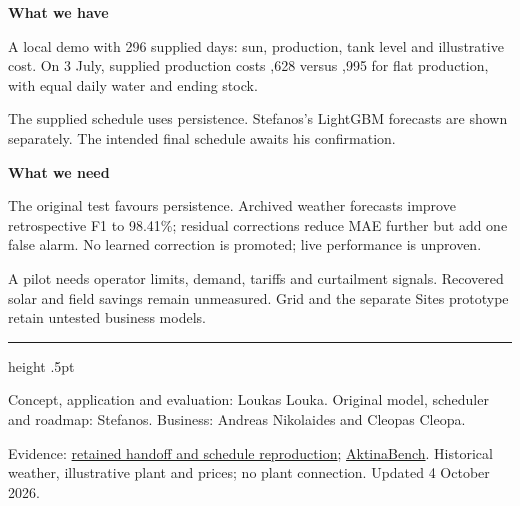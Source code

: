 \documentclass[11pt,a4paper]{article}
\begin{document}
\vspace{6mm}
\begin{minipage}[t]{.48\linewidth}
{\large\bfseries What we have}\par
A local demo with 296 supplied days: sun, production, tank level and illustrative cost. On 3 July, supplied production costs ,628 versus ,995 for flat production, with equal daily water and ending stock.

The supplied schedule uses persistence. Stefanos's LightGBM forecasts are shown separately. The intended final schedule awaits his confirmation.
\end{minipage}\hfill
\begin{minipage}[t]{.47\linewidth}
{\large\bfseries What we need}\par
The original test favours persistence. Archived weather forecasts improve retrospective F1 to 98.41\%; residual corrections reduce MAE further but add one false alarm. No learned correction is promoted; live performance is unproven.

A pilot needs operator limits, demand, tariffs and curtailment signals. Recovered solar and field savings remain unmeasured. Grid and the separate Sites prototype retain untested business models.
\end{minipage}

\vfill
\hrule height .5pt\vspace{3mm}
{\footnotesize Concept, application and evaluation: Loukas Louka. Original model, scheduler and roadmap: Stefanos. Business: Andreas Nikolaides and Cleopas Cleopa.\par
Evidence: \href{https://github.com/stefanosbordea/actina/tree/stefanos-model/app/handoff}{retained handoff and schedule reproduction}; \href{https://aktina-pafos-2026.vercel.app/benchmark.html}{AktinaBench}. Historical weather, illustrative plant and prices; no plant connection. Updated 4 October 2026.}
\end{document}
